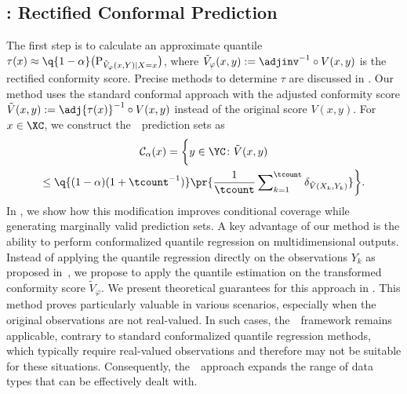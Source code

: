 \subsection{\RCP: Rectified Conformal Prediction}
  The first step is to calculate an approximate quantile $\tau(x)\approx \q{1-\alpha}\bigl(\textup{P}_{\tilde{V}_{\varphi}(x,Y)\mid X=x} \bigr)$, where $\tilde{V}_{\varphi}(x,y):=\adjinv^{-1}\circ V(x,y)$ is the rectified conformity score.
  Precise methods to determine $\tau$ are discussed in . Our method uses the standard conformal approach with the adjusted conformity score $\tilde{V}(x,y):=\adj{\tau(x)}^{-1}\circ V(x,y)$ instead of the original score $V(x,y)$. 
  For $x\in\XC$, we construct the~\RCP\ prediction sets as
  \begin{multline}\label{eq:def:prediction-set-algo}
    \textstyle \mathcal{C}_{\alpha}(x)
    = \bigg\{
      y\in\YC\colon \tilde{V}(x,y)
      \\
      \le \q{(1-\alpha)(1+\tcount^{-1})} \pr{\frac{1}{\tcount} \sum\nolimits_{k=1}^{\tcount} \delta_{\tilde{V}(X_{k},Y_{k})}}
    \bigg\}.
  \end{multline}
  In , we show how this modification improves conditional coverage while generating marginally valid prediction sets. A key advantage of our method is the ability to perform conformalized quantile regression on multidimensional outputs. Instead of applying the quantile regression directly on the observations $Y_{k}$ as proposed in~\cite{romano2019conformalized,kivaranovic2020adaptive}, we propose to apply the quantile estimation on the transformed conformity score $\tilde{V}_{\varphi}$. We present theoretical guarantees for this approach in . This method proves particularly valuable in various scenarios, especially when the original observations are not real-valued. In such cases, the~\RCP\ framework remains applicable, contrary to standard conformalized quantile regression methods, which typically require real-valued observations and therefore may not be suitable for these situations. Consequently, the~\RCP\ approach expands the range of data types that can be effectively dealt with.

